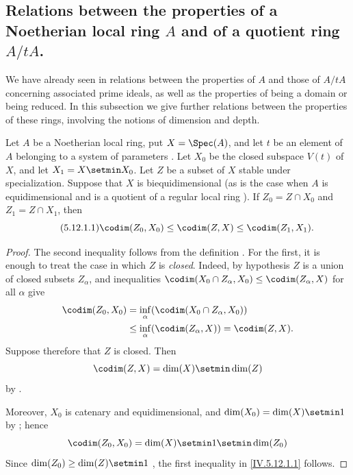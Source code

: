 \subsection{Relations between the properties of a Noetherian local
ring \texorpdfstring{$A$}{A} and of a quotient ring
\texorpdfstring{$A/tA$.}{A/tA}}
\label{subsection:IV.5.12}
\label{IV.5.12}

We have already seen in  relations between the
properties of $A$ and those of $A/tA$ concerning associated prime
ideals, as well as the properties of being a domain or being
reduced.  In this subsection we give further relations between the
properties of these rings, involving the notions of dimension and
depth.

\begin{proposition}[5.12.1]
\label{IV.5.12.1}
Let $A$ be a Noetherian local ring, put $X=\Spec(A)$, and let $t$
be an element of $A$ belonging to a system of parameters
.  Let $X_0$ be the closed subspace $V(t)$ of
$X$, and let $X_1=X\setmin X_0$.  Let $Z$ be a subset of $X$ stable
under specialization.  Suppose that $X$ is biequidimensional
\textup{(as is the case when $A$ is equidimensional and is a quotient of
a regular local ring )}.  If
$Z_0=Z\cap X_0$ and $Z_1=Z\cap X_1$, then
\begin{equation}
\tag{5.12.1.1}
\label{IV.5.12.1.1}
  \codim(Z_0,X_0)\leq\codim(Z,X)\leq\codim(Z_1,X_1).
\end{equation}
\end{proposition}

\begin{proof}
The second inequality follows from the definition
.  For the first, it is enough to treat the case
in which $Z$ is \emph{closed}.  Indeed, by hypothesis $Z$ is a union of
closed subsets $Z_\alpha$, and inequalities $\codim(X_0\cap Z_\alpha,X_0)\leq\codim(Z_\alpha,X)$
for all $\alpha$ give
\[
\begin{split}
  \codim(Z_0,X_0)
  &=\inf_\alpha(\codim(X_0\cap Z_\alpha,X_0))\\
  &\leq\inf_\alpha(\codim(Z_\alpha,X))
   =\codim(Z,X).
\end{split}
\]
Suppose therefore that $Z$ is closed.  Then
\[
  \codim(Z,X)=\dim(X)\setmin\dim(Z)
\]
by .


Moreover, $X_0$ is catenary and equidimensional, and
$\dim(X_0)=\dim(X)\setmin 1$ by ; hence
\[
  \codim(Z_0,X_0)
  =\dim(X)\setmin 1\setmin\dim(Z_0)
\]
Since $\dim(Z_0)\geq\dim(Z)\setmin 1$ , the first
inequality in \eqref{IV.5.12.1.1} follows.
\end{proof}

